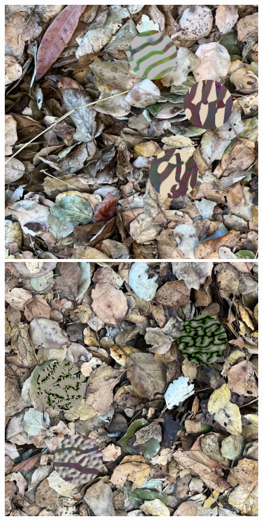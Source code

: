 \documentclass[sigconf]{acmart}
\begin{document}
\begin{figure}
    \hfill
    \includegraphics[scale=0.16]{images/20221016_step_2368.png}
    \hfill
    \includegraphics[scale=0.16]{images/20221016_step_3420.png}
    \hfill

\end{figure}
\end{document}
